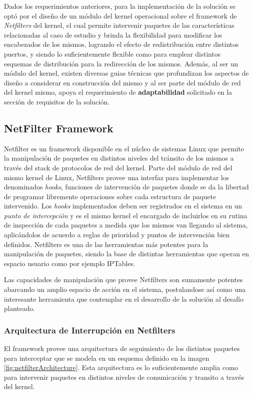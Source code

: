 Dados los requerimientos anteriores, para la implementación de la solución se optó por el diseño de un módulo del kernel operacional sobre el framework de \emph{Netfilters} del kernel, el cual permite intervenir paquetes de las características relacionadas al caso de estudio y brinda la flexibilidad para modificar los encabezados de los mismos, logrando el efecto de redistribución entre distintos puertos, y siendo lo suficientemente flexible como para emplear distintos esquemas de distribución para la redirección de los mismos. Además, al ser un módulo del kernel, existen diversas guias técnicas que profundizan los aspectos de diseño a considerar en construcción del mismo y al ser parte del módulo de red del kernel mismo, apoya el requerimiento de \textbf{adaptabilidad} solicitado en la sección de requisitos de la solución.

\subsection{NetFilter Framework}
Netfilter \cite{report:netfilterModule} es un framework disponible en el núcleo de sistemas Linux que permite la manipulación de paquetes en distintos niveles del tránsito de los mismos a través del stack de protocolos de red del kernel. Parte del módulo de red del mismo kernel de Linux, Netfilters provee una interfaz para implementar los denominados \emph{hooks}, funciones de intervención de paquetes donde se da la libertad de programar libremente operaciones sobre cada estructura de paquete intervenido. Los \emph{hooks} implementados deben ser registrados en el sistema en un \emph{punto de intercepción} y es el mismo kernel el encargado de incluirlos en su rutina de inspección de cada paquetes a medida que los mismos van llegando al sistema, aplicándolos de acuerdo a reglas de prioridad y puntos de intervención bien definidos. Netfilters es una de las herramientas más potentes para la manipulación de paquetes, siendo la base de distintas herramientas que operan en espacio usuario como por ejemplo IPTables.

Las capacidades de manipulación que provee Netfilters son sumamente potentes abarcando un amplio espacio de acción en el sistema, postulandose así como una interesante herramienta que contemplar en el desarrollo de la solución al desafío planteado.

\subsubsection{Arquitectura de Interrupción en Netfilters}
El framework provee una arquitectura de seguimiento de los distintos paquetes para interceptar que se modela en un esquema definido en la imagen \ref{fig:netfilterArchitecture}. Esta arquitectura es lo suficientemente amplia como para intervenir paquetes en distintos niveles de comunicación y transito a través del kernel.


